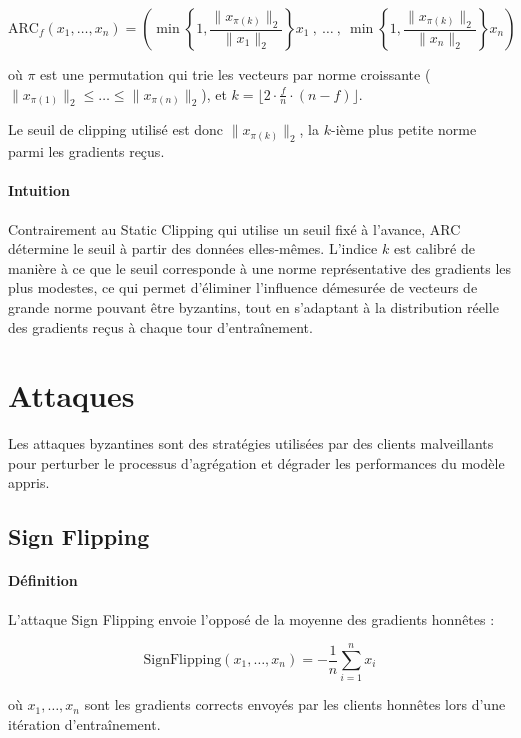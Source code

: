 \documentclass[a4paper,11pt]{article}
\begin{document}
\[
\mathrm{ARC}_f(x_1,\dots,x_n)
=
\left(
\min\!\left\{1, \frac{\|x_{\pi(k)}\|_2}{\|x_1\|_2}\right\} x_1
\ , \ \dots \ , \
\min\!\left\{1, \frac{\|x_{\pi(k)}\|_2}{\|x_n\|_2}\right\} x_n
\right)
\]

où $\pi$ est une permutation qui trie les vecteurs par norme croissante ($\|x_{\pi(1)}\|_2 \leq \ldots \leq \|x_{\pi(n)}\|_2$), et $k = \lfloor 2 \cdot \frac{f}{n} \cdot (n-f) \rfloor$.

Le seuil de clipping utilisé est donc $\|x_{\pi(k)}\|_2$, la $k$-ième plus petite norme parmi les gradients reçus.

\paragraph{Intuition}

Contrairement au Static Clipping qui utilise un seuil fixé à l'avance, ARC détermine le seuil à partir des données elles-mêmes. L'indice $k$ est calibré de manière à ce que le seuil corresponde à une norme représentative des gradients les plus modestes, ce qui permet d'éliminer l'influence démesurée de vecteurs de grande norme pouvant être byzantins, tout en s'adaptant à la distribution réelle des gradients reçus à chaque tour d'entraînement.

\section{Attaques}

Les attaques byzantines sont des stratégies utilisées par des clients malveillants pour perturber le processus d'agrégation et dégrader les performances du modèle appris.

\subsection{Sign Flipping}

\paragraph{Définition}

L'attaque Sign Flipping envoie l'opposé de la moyenne des gradients honnêtes :

\[
\mathrm{SignFlipping}(x_1,\dots,x_n) = -\frac{1}{n}\sum_{i=1}^{n} x_i
\]

où $x_1,\dots,x_n$ sont les gradients corrects envoyés par les clients honnêtes lors d'une itération d'entraînement.
\end{document}
